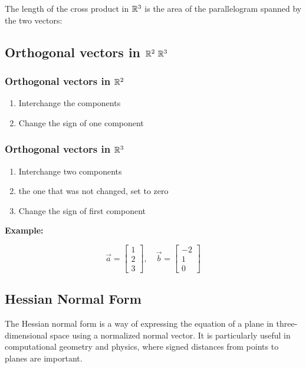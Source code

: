 The length of the cross product in \(\mathbb{R}^3\) is the area of the parallelogram spanned by the two vectors:

\subsection{Orthogonal vectors in \texorpdfstring{\(\mathbb{R}^2\ \mathbb{R}^3\)}{}}

\subsubsection{Orthogonal vectors in \texorpdfstring{\(\mathbb{R}^2\)}{}}

\begin{enumerate}
	\item Interchange the components
	\item Change the sign of one component
\end{enumerate}

\subsubsection{Orthogonal vectors in \texorpdfstring{\(\mathbb{R}^3\)}{}}
\begin{enumerate}
	\item Interchange two components
	\item the one that was not changed, set to zero
	\item Change the sign of first component
\end{enumerate}

\textbf{Example:}

\[
	\vec{a} = \begin{bmatrix} 1 \\ 2 \\ 3 \end{bmatrix}, \quad \vec{b} = \begin{bmatrix} -2 \\ 1 \\ 0 \end{bmatrix}
\]

\subsection{Hessian Normal Form}

The Hessian normal form is a way of expressing the equation of a plane in three-dimensional space using a normalized normal vector. It is particularly useful in computational geometry and physics, where signed distances from points to planes are important.

